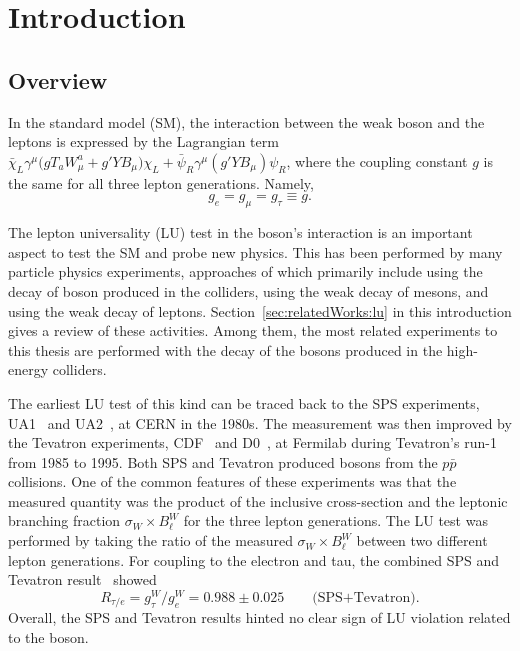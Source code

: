 \chapter{Introduction}
\label{sec:introduction}

\section{Overview}
\label{sec:introduction:overview}

In the standard model (SM), the interaction between the weak boson and the leptons is expressed by the Lagrangian term $\bar{\chi}_L \gamma^\mu \big( g T_a W^a_\mu +g'Y B_\mu \big) \chi_L + \bar{\psi}_R \gamma^\mu (g' Y B_\mu) \psi_R $, where the coupling constant $g$ is the same for all three lepton generations. Namely,
\begin{equation*}
	g_e = g_\mu = g_\tau \equiv g.
\end{equation*}

\noindent The lepton universality (LU) test in the \PW boson's interaction is an important aspect to test the SM and probe new physics. This has been performed by many particle physics experiments, approaches of which primarily include using the decay of \PW boson produced in the colliders, using the weak decay of mesons, and using the weak decay of leptons. Section~\ref{sec:relatedWorks:lu} in this introduction gives a review of these activities. Among them, the most related experiments to this thesis are performed with the decay of the \PW bosons produced in the high-energy colliders.


The earliest LU test of this kind can be traced back to the SPS experiments, UA1~\cite{Albajar:1988ka} and UA2~\cite{appel1986measurement, Alitti:1991eh, Alitti:1992hv}, at CERN in the 1980s. The measurement was then improved by the Tevatron experiments, CDF~\cite{Abazov:2003sv, Abe:1990sd, Abe:1992ys, Abe:1991fb} and D0~\cite{ Abbott:1999tt, Abachi:1995xc, Abbott:1999pk}, at Fermilab during Tevatron's run-1 from 1985 to 1995. Both SPS and Tevatron produced \PW bosons from the $p\bar{p}$ collisions. One of the common features of these experiments was that the measured quantity was the product of the inclusive \PW cross-section and the \PW leptonic branching fraction $\sigma_W \times B^W_\ell$ for the three lepton generations. The LU test was performed by taking the ratio of the measured $\sigma_W \times B^W_\ell$ between two different lepton generations. For \PW coupling to the electron and tau, the combined SPS and Tevatron result~\cite{Abbott:1999pk} showed
\begin{equation*}
    R_{\tau/e} = g^W_\tau / g^W_e = 0.988 \pm 0.025 \qquad \text{(SPS+Tevatron)}.
\end{equation*}
\noindent Overall, the SPS and Tevatron results hinted no clear sign of LU violation related to the \PW boson. 



